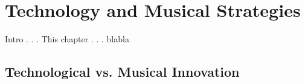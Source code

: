 \hypertarget{chapter4}{}
\chapter{Technology and Musical Strategies}

Intro . . . This chapter . . . blabla

\section{Technological vs. Musical Innovation}

